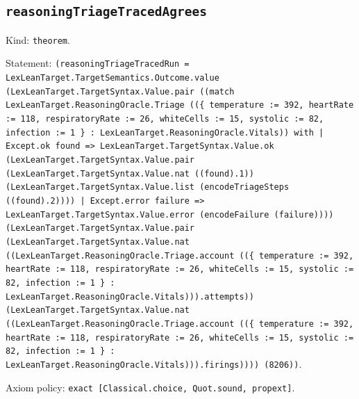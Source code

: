 \documentclass[11pt]{article}
\begin{document}
\subsection*{\texttt{reasoningTriageTracedAgrees}}
\noindent Kind: \texttt{theorem}.\par
\noindent Statement: \texttt{(reasoningTriageTracedRun = LexLeanTarget.TargetSemantics.Outcome.value (LexLeanTarget.TargetSyntax.Value.pair ((match LexLeanTarget.ReasoningOracle.Triage ((\{ temperature := 392, heartRate := 118, respiratoryRate := 26, whiteCells := 15, systolic := 82, infection := 1 \} : LexLeanTarget.ReasoningOracle.Vitals)) with | Except.ok found => LexLeanTarget.TargetSyntax.Value.ok (LexLeanTarget.TargetSyntax.Value.pair (LexLeanTarget.TargetSyntax.Value.nat ((found).1)) (LexLeanTarget.TargetSyntax.Value.list (encodeTriageSteps ((found).2)))) | Except.error failure => LexLeanTarget.TargetSyntax.Value.error (encodeFailure (failure)))) (LexLeanTarget.TargetSyntax.Value.pair (LexLeanTarget.TargetSyntax.Value.nat ((LexLeanTarget.ReasoningOracle.Triage.account ((\{ temperature := 392, heartRate := 118, respiratoryRate := 26, whiteCells := 15, systolic := 82, infection := 1 \} : LexLeanTarget.ReasoningOracle.Vitals))).attempts)) (LexLeanTarget.TargetSyntax.Value.nat ((LexLeanTarget.ReasoningOracle.Triage.account ((\{ temperature := 392, heartRate := 118, respiratoryRate := 26, whiteCells := 15, systolic := 82, infection := 1 \} : LexLeanTarget.ReasoningOracle.Vitals))).firings)))) (8206))}.\par
\noindent Axiom policy: \texttt{exact [Classical.choice, Quot.sound, propext]}.\par
\end{document}
